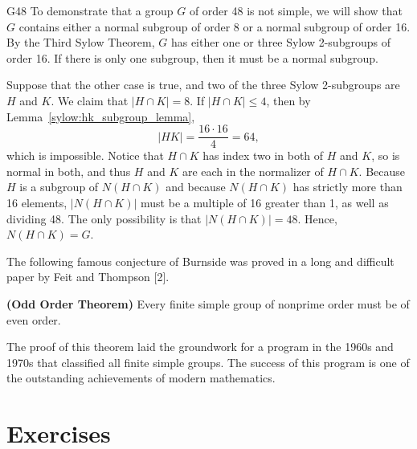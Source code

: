\begin{example}{G48}
To demonstrate that a group $G$ of order 48 is not simple, we will
show that $G$ contains either a normal subgroup of order 8 or a normal
subgroup of order 16.  By the Third Sylow Theorem, $G$ has either one
or three Sylow 2-subgroups of order 16.  If there is only one
subgroup, then it must be a normal subgroup. 


 
 
Suppose that the other case is true, and two of the three Sylow
2-subgroups are $H$ and $K$. We claim that  $|H \cap K| = 8$.  If $|H
\cap K| \leq 4$, then by Lemma~\ref{sylow:hk_subgroup_lemma}, 
\[
|HK| = \frac{16 \cdot 16}{4} =64,
\]
which is impossible.  
Notice that $H \cap K$ has index two in both of $H$ and $K$, so is normal in both, and thus $H$ and $K$ are each in the normalizer of  $H \cap K$.  Because $H$ is a subgroup of $N(H \cap K)$ and because $N(H \cap K)$ has strictly more than 16 elements, $|N(H \cap K)|$ must be a multiple of 16 greater than
1, as well as dividing 48.   The only possibility is that $|N(H \cap K)|= 48$.
Hence, $N(H \cap K) = G$.



\end{example}

 
 
\medskip
 
 
The following famous conjecture of Burnside was proved in a long and
difficult paper by Feit and Thompson [2].   
 
 
\begin{theorem} 
\textbf{(Odd Order Theorem) }
Every finite simple group of nonprime order must be of even order. 
\end{theorem}
 
 
The proof of this theorem laid the groundwork for a program in the 
1960s and 1970s that classified all finite simple groups.
The success of this program is one of the outstanding achievements of
modern mathematics. 
 
 
 
\section*{Exercises}
\exrule
 
